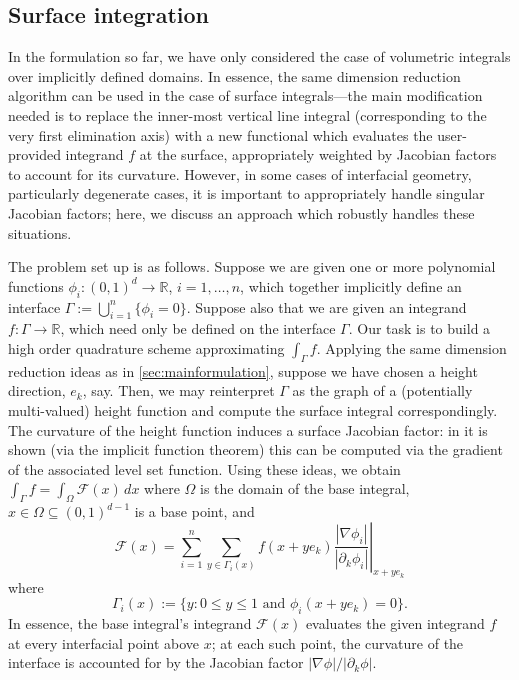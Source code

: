 \documentclass[onefignum,onetabnum,onealgnum,oneeqnum]{siamart190516}
\newcommand{\R}{\mathbb R}
\begin{document}
%








\subsection{Surface integration}
\label{sec:surface}

In the formulation so far, we have only considered the case of volumetric integrals over implicitly defined domains. In essence, the same dimension reduction algorithm can be used in the case of surface integrals---the main modification needed is to replace the inner-most vertical line integral (corresponding to the very first elimination axis) with a new functional which evaluates the user-provided integrand $f$ at the surface, appropriately weighted by Jacobian factors to account for its curvature. However, in some cases of interfacial geometry, particularly degenerate cases, it is important to appropriately handle singular Jacobian factors; here, we discuss an approach which robustly handles these situations.

The problem set up is as follows. Suppose we are given one or more polynomial functions $\phi_i : (0,1)^d \to \R$, $i = 1, \ldots, n$, which together implicitly define an interface $\Gamma := \bigcup_{i=1}^n \{\phi_i = 0\}$. Suppose also that we are given an integrand $f : \Gamma \to \R$, which need only be defined on the interface $\Gamma$. Our task is to build a high order quadrature scheme approximating $\int_\Gamma f$. Applying the same dimension reduction ideas as in \cref{sec:mainformulation}, suppose we have chosen a height direction, $e_k$, say. Then, we may reinterpret $\Gamma$ as the graph of a (potentially multi-valued) height function and compute the surface integral correspondingly. The curvature of the height function induces a surface Jacobian factor: in \cite{HighorderImplicitQuad} it is shown (via the implicit function theorem) this can be computed via the gradient of the associated level set function. Using these ideas, we obtain $\int_\Gamma f = \int_\Omega {\mathcal F}(x)\, dx$ where $\Omega$ is the domain of the base integral, $x \in \Omega \subseteq (0,1)^{d-1}$ is a base point, and
\begin{equation} \label{eq:surf1} {\mathcal F}(x) = \sum_{i = 1}^n \sum_{y \in \Gamma_i(x)} f(x + y e_k) \left. \frac{ |\nabla \phi_i| }{ |\partial_k \phi_i| } \right|_{x + y e_k} \end{equation}
where
\[  \Gamma_i(x) := \{y : 0 \leq y \leq 1 \text{ and } \phi_i(x + y e_k) = 0 \}. \]
In essence, the base integral's integrand ${\mathcal F}(x)$ evaluates the given integrand $f$ at every interfacial point above $x$; at each such point, the curvature of the interface is accounted for by the Jacobian factor $|\nabla \phi|/|\partial_k \phi|$.
\end{document}
